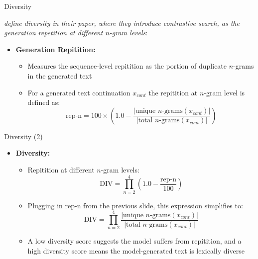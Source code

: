 \begin{vbframe}{Diversity}

 \textit{define diversity in their paper, where they introduce contrastive search, as the generation repetition at different $n$-gram levels}:

\begin{itemize}
    \item \textbf{Generation Repitition:}
    \begin{itemize}
        \item Measures the sequence-level repitition as the portion of duplicate $n$-grams in the generated text
        \item For a generated text continuation $x_{cont}$ the repitition at $n$-gram level is defined as: 
        $$\text{rep-n} = 100 \times \left(1.0 - \frac{|\text{unique $n$-grams}(x_{cont})|}{|\text{total $n$-grams}(x_{cont})|}\right)$$ 
    \end{itemize}
\end{itemize}

\end{vbframe}

\begin{vbframe}{Diversity (2)}

\vfill

\begin{itemize}
\item \textbf{Diversity:}
    \begin{itemize}
        \item Repitition at different $n$-gram levels:
        $$\text{DIV} = \prod_{n=2}^{4}\left(1.0 - \frac{\text{rep-n}}{100}\right)$$
        \item Plugging in rep-n from the previous slide, this expression simplifies to:
        $$\text{DIV} = \prod_{n=2}^{4} \frac{|\text{unique $n$-grams}(x_{cont})|}{|\text{total $n$-grams}(x_{cont})|}$$
        \item A low diversity score suggests the model suffers from repitition, and a high diversity score means the model-generated text is lexically diverse
    \end{itemize}
\end{itemize}

\vfill
        
\end{vbframe}



